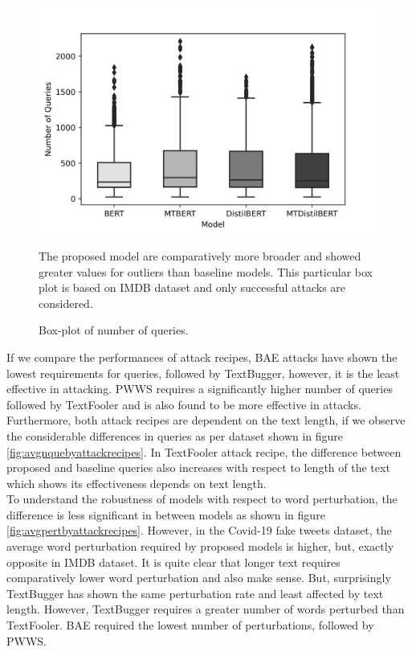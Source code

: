 \documentclass[%
	BCOR=8mm, %
	DIV=12,
	toc=bibliography, %
	toc=listof, %
	oneside, %
	egregdoesnotlikesansseriftitles, %
	]{scrbook}
\begin{document}
\begin{figure}[H]
    \centering
    \includegraphics[width=0.7\linewidth]{img/NumQueriesDist_IMDB.png}
    \caption{Box-plot of number of queries.}{ The proposed model are comparatively more broader and showed greater values for outliers than baseline models. This particular box plot is based on IMDB dataset and only successful attacks are considered.}
    \label{fig:numofqueriesdist}
\end{figure}
If we compare the performances of attack recipes, BAE attacks have shown the lowest requirements for queries, followed by TextBugger, however, it is the least effective in attacking. PWWS requires a significantly higher number of queries followed by TextFooler and is also found to be more effective in attacks. Furthermore, both attack recipes are dependent on the text length, if we observe the considerable differences in queries as per dataset shown in figure \ref{fig:avgnquebyattackrecipes}. In TextFooler attack recipe, the difference between proposed and baseline queries also increases with respect to length of the text which shows its effectiveness depends on text length. \\
To understand the robustness of models with respect to word perturbation, the difference is less significant in between models as shown in figure \ref{fig:avgpertbyattackrecipes}. However, in the Covid-19 fake tweets dataset, the average word perturbation required by proposed models is higher, but, exactly opposite in IMDB dataset. It is quite clear that longer text requires comparatively lower word perturbation and also make sense. But, surprisingly TextBugger has shown the same perturbation rate and least affected by text length. However,  TextBugger requires a greater number of words perturbed than TextFooler. BAE required the lowest number of perturbations, followed by PWWS.
\end{document}
